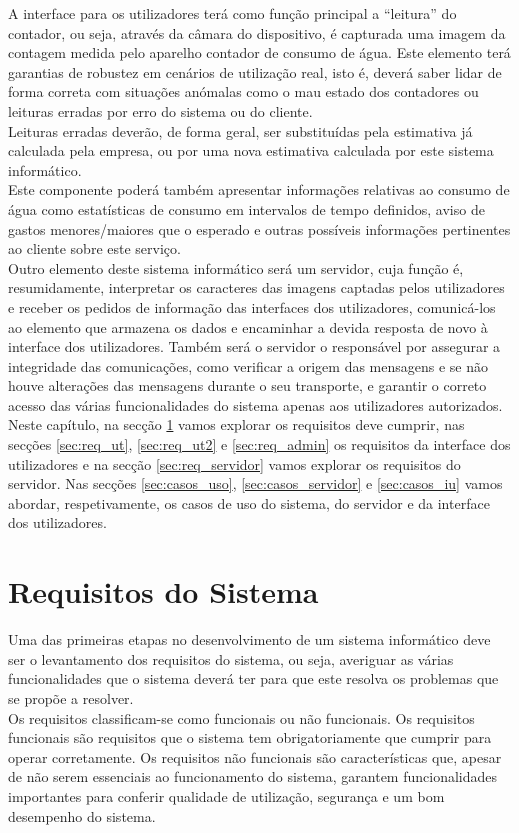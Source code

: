 A interface para os utilizadores terá como função principal a “leitura” do contador, ou seja, através da câmara do dispositivo, é capturada uma imagem da contagem medida pelo aparelho contador de consumo de água. Este elemento terá garantias de robustez em cenários de utilização real, isto é, deverá saber lidar de forma correta com situações anómalas como o mau estado dos contadores ou leituras erradas por erro do sistema ou do cliente.\\
Leituras erradas deverão, de forma geral, ser substituídas pela estimativa já calculada pela empresa, ou por uma nova estimativa calculada por este sistema informático.\\
Este componente poderá também apresentar informações relativas ao consumo de água como estatísticas de consumo em intervalos de tempo definidos, aviso de gastos menores/maiores que o esperado e outras possíveis informações pertinentes ao cliente sobre este serviço.\\
Outro elemento deste sistema informático será um servidor, cuja função é, resumidamente, interpretar os caracteres das imagens captadas pelos utilizadores e receber os pedidos de informação das interfaces dos utilizadores, comunicá-los ao elemento que armazena os dados e encaminhar a devida resposta de novo à interface dos utilizadores. Também será o servidor o responsável por assegurar a integridade das comunicações, como verificar a origem das mensagens e se não houve alterações das mensagens durante o seu transporte, e garantir o correto acesso das várias funcionalidades do sistema apenas aos utilizadores autorizados.\\

Neste capítulo, na secção \ref{sec:req_sis} vamos explorar os requisitos deve cumprir, nas secções \ref{sec:req_ut}, \ref{sec:req_ut2} e \ref{sec:req_admin} os requisitos da interface dos utilizadores e na secção \ref{sec:req_servidor} vamos explorar os requisitos do servidor. Nas secções \ref{sec:casos_uso}, \ref{sec:casos_servidor} e \ref{sec:casos_iu} vamos abordar, respetivamente, os casos de uso do sistema, do servidor e da interface dos utilizadores.

\section{Requisitos do Sistema} \label{sec:req_sis}
Uma das primeiras etapas no desenvolvimento de um sistema informático deve ser o levantamento dos requisitos do sistema, ou seja, averiguar as várias funcionalidades que o sistema deverá ter para que este resolva os problemas que se propõe a resolver.\\
Os requisitos classificam-se como funcionais ou não funcionais. Os requisitos funcionais são requisitos que o sistema tem obrigatoriamente que cumprir para operar corretamente. Os requisitos não funcionais são características que, apesar de não serem essenciais ao funcionamento do sistema, garantem funcionalidades importantes para conferir qualidade de utilização, segurança e um bom desempenho do sistema.

